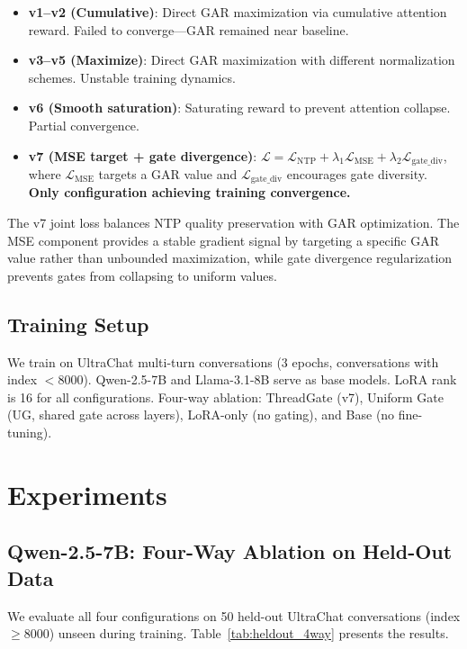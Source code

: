 \documentclass[11pt,a4paper]{article}
\begin{document}
\begin{itemize}
\item \textbf{v1--v2 (Cumulative)}: Direct GAR maximization via cumulative attention reward. Failed to converge---GAR remained near baseline.
\item \textbf{v3--v5 (Maximize)}: Direct GAR maximization with different normalization schemes. Unstable training dynamics.
\item \textbf{v6 (Smooth saturation)}: Saturating reward to prevent attention collapse. Partial convergence.
\item \textbf{v7 (MSE target + gate divergence)}: $\mathcal{L} = \mathcal{L}_{\text{NTP}} + \lambda_1 \mathcal{L}_{\text{MSE}} + \lambda_2 \mathcal{L}_{\text{gate\_div}}$, where $\mathcal{L}_{\text{MSE}}$ targets a GAR value and $\mathcal{L}_{\text{gate\_div}}$ encourages gate diversity. \textbf{Only configuration achieving training convergence.}
\end{itemize}

The v7 joint loss balances NTP quality preservation with GAR optimization. The MSE component provides a stable gradient signal by targeting a specific GAR value rather than unbounded maximization, while gate divergence regularization prevents gates from collapsing to uniform values.

\subsection{Training Setup}

We train on UltraChat multi-turn conversations (3 epochs, conversations with index $<$8000). Qwen-2.5-7B and Llama-3.1-8B serve as base models. LoRA rank is 16 for all configurations. Four-way ablation: ThreadGate (v7), Uniform Gate (UG, shared gate across layers), LoRA-only (no gating), and Base (no fine-tuning).

\section{Experiments}

\subsection{Qwen-2.5-7B: Four-Way Ablation on Held-Out Data}

We evaluate all four configurations on 50 held-out UltraChat conversations (index$\geq$8000) unseen during training. Table~\ref{tab:heldout_4way} presents the results.
\end{document}
